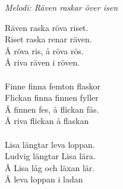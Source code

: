{\footnotesize\textit{Melodi: Räven raskar över isen}}\par
\vspace{10pt}
Räven raska röva riset.\\
Riset raska renar räven.\\
Å röva ris, å röva rös.\\
Å riva räven i röven.\\
\\
Finne finna femton flaskor\\
Flickan finna finnen fyller\\
Å finnen fes, å flickan fås.\\
Å riva flickan å flaskan\\
\\
Lisa längtar leva loppan.\\
Ludvig längtar Lisa lära.\\
Å Lisa låg och läxan lär.\\
Å leva loppan i ladan

